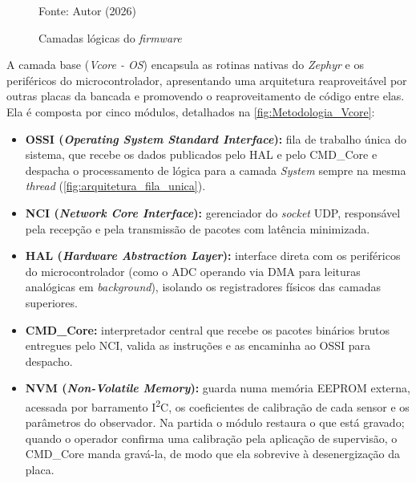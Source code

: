 \begin{figure}[H]
    \centering
    \caption{Camadas lógicas do \textit{firmware}}
    \label{fig:Metodologia_Diagrama_placas}

    Fonte: Autor (2026)
\end{figure}

A camada base (\textit{Vcore - OS}) encapsula as rotinas nativas do
\textit{Zephyr} e os periféricos do microcontrolador, apresentando uma
arquitetura reaproveitável por outras placas da bancada e promovendo o
reaproveitamento de código entre elas. Ela é composta por cinco módulos, detalhados na
\autoref{fig:Metodologia_Vcore}:

\begin{itemize}
    \item \textbf{OSSI (\textit{Operating System Standard Interface}):} fila de trabalho única do sistema, que recebe os dados publicados pelo HAL e pelo CMD\_Core e despacha o processamento de lógica para a camada \textit{System} sempre na mesma \textit{thread} (\autoref{fig:arquitetura_fila_unica}).
    \item \textbf{NCI (\textit{Network Core Interface}):} gerenciador do \textit{socket} UDP, responsável pela recepção e pela transmissão de pacotes com latência minimizada.
    \item \textbf{HAL (\textit{Hardware Abstraction Layer}):} interface direta com os periféricos do microcontrolador (como o ADC operando via DMA para leituras analógicas em \textit{background}), isolando os registradores físicos das camadas superiores.
    \item \textbf{CMD\_Core:} interpretador central que recebe os pacotes binários brutos entregues pelo NCI, valida as instruções e as encaminha ao OSSI para despacho.
    \item \textbf{NVM (\textit{Non-Volatile Memory}):} guarda numa memória EEPROM externa, acessada por barramento I\textsuperscript{2}C, os coeficientes de calibração de cada sensor e os parâmetros do observador. Na partida o módulo restaura o que está gravado; quando o operador confirma uma calibração pela aplicação de supervisão, o CMD\_Core manda gravá-la, de modo que ela sobrevive à desenergização da placa.
\end{itemize}

